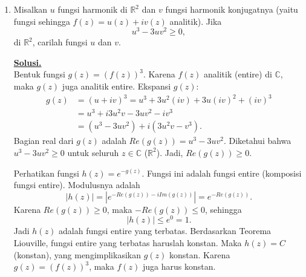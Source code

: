 \documentclass[12pt,twoside]{article}
\newenvironment{solution}
{
	\par\noindent\textbf{\underline{Solusi.}}\\
}
{
	\par
}
\begin{document}
\begin{enumerate}
\begin{solution}
          Kita ingin mengestimasi $|F(\alpha)|$ untuk sebarang $\alpha \in [0,1]$.
          Karena $F(0)=0$ dan $F(1)=0$, fungsi $F(t)$ dapat diaproksimasi dengan interpolasi linear $L(t)$ yang melalui $(0,0)$ dan $(1,0)$, yaitu $L(t) = 0$.
          Berdasarkan teorema sisa interpolasi (atau generalisasi teorema nilai rata-rata), untuk setiap $t \in [0,1]$, terdapat $\xi \in (0,1)$ sedemikian sehingga
          \[ F(t) - L(t) = \frac{F''(\xi)}{2} (t-0)(t-1). \]
          Karena $L(t)=0$, maka
          \[ F(t) = \frac{F''(\xi)}{2} t(t-1). \]
          Ambil nilai mutlak:
          \[ |F(t)| = \frac{|F''(\xi)|}{2} |t(t-1)| \le \frac{M}{2} t(1-t) \]
          (mengingat $t \in [0,1]$, maka $|t(t-1)| = t(1-t)$).

          Fungsi $g(t) = t(1-t)$ mencapai maksimum di $t=1/2$ dengan nilai $1/4$.
          Sehingga
          \[ |F(t)| \le \frac{M}{2} \cdot \frac{1}{4} = \frac{M}{8}. \]
          Oleh karena itu, untuk setiap $\alpha \in [0,1]$:
          \[ \left|\int_0^\alpha f(x) \, dx\right| \le \frac{1}{8} \sup_{x\in[0,1]} |f'(x)|. \]
          Terbukti.
        \end{solution}


  \item Misalkan $u$ fungsi harmonik di $\mathbb{R}^2$ dan $v$ fungsi harmonik konjugatnya (yaitu fungsi sehingga $f(z)=u(z)+iv(z)$ analitik). Jika
        $$u^3-3uv^2\geq 0,$$
        di $\mathbb{R}^2$, carilah fungsi $u$ dan $v$.
        \begin{solution}
          Bentuk fungsi $g(z) = (f(z))^3$. Karena $f(z)$ analitik (entire) di $\mathbb{C}$, maka $g(z)$ juga analitik entire.
          Ekspansi $g(z)$:
          \begin{align*}
            g(z) & = (u+iv)^3 = u^3 + 3u^2(iv) + 3u(iv)^2 + (iv)^3 \\
                 & = u^3 + i3u^2v - 3uv^2 - i v^3                  \\
                 & = (u^3 - 3uv^2) + i(3u^2v - v^3).
          \end{align*}
          Bagian real dari $g(z)$ adalah $Re(g(z)) = u^3 - 3uv^2$.
          Diketahui bahwa $u^3 - 3uv^2 \ge 0$ untuk seluruh $z \in \mathbb{C}$ ($\mathbb{R}^2$).
          Jadi, $Re(g(z)) \ge 0$.

          Perhatikan fungsi $h(z) = e^{-g(z)}$. Fungsi ini adalah fungsi entire (komposisi fungsi entire).
          Modulusnya adalah
          \[ |h(z)| = |e^{-Re(g(z)) - i Im(g(z))}| = e^{-Re(g(z))}. \]
          Karena $Re(g(z)) \ge 0$, maka $-Re(g(z)) \le 0$, sehingga
          \[ |h(z)| \le e^0 = 1. \]
          Jadi $h(z)$ adalah fungsi entire yang terbatas.
          Berdasarkan Teorema Liouville, fungsi entire yang terbatas haruslah konstan.
          Maka $h(z) = C$ (konstan), yang mengimplikasikan $g(z)$ konstan.
          Karena $g(z) = (f(z))^3$, maka $f(z)$ juga harus konstan.


\end{solution}
\end{enumerate}
\end{document}
